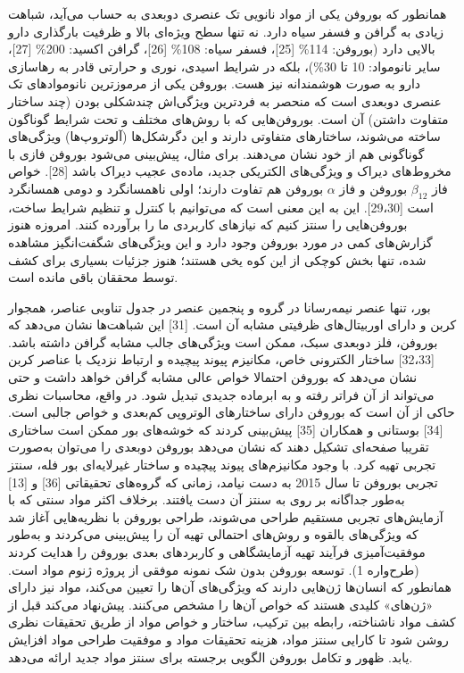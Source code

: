 همانطور که بوروفن یکی از مواد نانویی تک عنصری دوبعدی به حساب می‌آید، شباهت زیادی به گرافن و فسفر سیاه دارد. نه تنها سطح ویژه‌ای بالا و ظرفیت بارگذاری دارو بالایی دارد (بوروفن: 114\% [25]، فسفر سیاه: 108\% [26]، گرافن اکسید: 200\% [27]، سایر نانومواد: 10 تا 30\%)، بلکه در شرایط اسیدی، نوری و حرارتی قادر به رهاسازی دارو به صورت هوشمندانه نیز هست. بوروفن یکی از مرموزترین نانوموادهای تک عنصری دوبعدی است که منحصر به فردترین ویژگی‌اش چندشکلی بودن (چند ساختار متفاوت داشتن) آن است. بوروفن‌هایی که با روش‌های مختلف و تحت شرایط گوناگون ساخته می‌شوند، ساختارهای متفاوتی دارند و این دگرشکل‌ها (آلوتروپ‌ها) ویژگی‌های گوناگونی هم از خود نشان می‌دهند. برای مثال، پیش‌بینی می‌شود بوروفن فازی  با مخروط‌های دیراک و ویژگی‌های الکتریکی جدید، ماده‌ی عجیب دیراک باشد [28]. خواص فاز $\beta_{12}$ بوروفن و فاز $\alpha$ بوروفن هم تفاوت دارند؛ اولی ناهمسانگرد و دومی همسانگرد است [29،30]. این به این معنی است که می‌توانیم با کنترل و تنظیم شرایط ساخت، بوروفن‌هایی را سنتز کنیم که نیازهای کاربردی ما را برآورده کنند. امروزه هنوز گزارش‌های کمی در مورد بوروفن وجود دارد و این ویژگی‌های شگفت‌انگیز مشاهده شده، تنها بخش کوچکی از این کوه یخی هستند؛ هنوز جزئیات بسیاری برای کشف توسط محققان باقی مانده است.

بور، تنها عنصر نیمه‌رسانا در گروه  و پنجمین عنصر در جدول تناوبی عناصر، همجوار کربن و دارای اوربیتال‌های ظرفیتی مشابه آن است. [31] این شباهت‌ها نشان می‌دهد که بوروفن، فلز دوبعدی سبک، ممکن است ویژگی‌های جالب مشابه گرافن داشته باشد. [32،33] ساختار الکترونی خاص، مکانیزم پیوند پیچیده و ارتباط نزدیک با عناصر کربن نشان می‌دهد که بوروفن احتمالا خواص عالی مشابه گرافن خواهد داشت و حتی می‌تواند از آن فراتر رفته و به ابرماده جدیدی تبدیل شود. در واقع، محاسبات نظری حاکی از آن است که بوروفن دارای ساختارهای الوتروپی کم‌بعدی و خواص جالبی است. [34] بوستانی و همکاران [35] پیش‌بینی کردند که خوشه‌های بور ممکن است ساختاری تقریبا صفحه‌ای تشکیل دهند که نشان می‌دهد بوروفن دوبعدی را می‌توان به‌صورت تجربی تهیه کرد. با وجود مکانیزم‌های پیوند پیچیده و ساختار غیرلایه‌ای بور فله، سنتز تجربی بوروفن تا سال 2015 به دست نیامد، زمانی که گروه‌های تحقیقاتی  [36] و  [13] به‌طور جداگانه بر روی  به سنتز آن دست یافتند. برخلاف اکثر مواد سنتی که با آزمایش‌های تجربی مستقیم طراحی می‌شوند، طراحی بوروفن با نظریه‌هایی آغاز شد که ویژگی‌های بالقوه و روش‌های احتمالی تهیه آن را پیش‌بینی می‌کردند و به‌طور موفقیت‌آمیزی فرآیند تهیه آزمایشگاهی و کاربردهای بعدی بوروفن را هدایت کردند (طرح‌واره 1). توسعه بوروفن بدون شک نمونه موفقی از پروژه ژنوم مواد  است. همانطور که انسان‌ها ژن‌هایی دارند که ویژگی‌های آن‌ها را تعیین می‌کند، مواد نیز دارای «ژن‌های» کلیدی هستند که خواص آن‌ها را مشخص می‌کنند.  پیش‌نهاد می‌کند قبل از کشف مواد ناشناخته، رابطه بین ترکیب، ساختار و خواص مواد از طریق تحقیقات نظری روشن شود تا کارایی سنتز مواد، هزینه تحقیقات مواد و موفقیت طراحی مواد افزایش یابد. ظهور و تکامل بوروفن الگویی برجسته برای سنتز مواد جدید ارائه می‌دهد.

